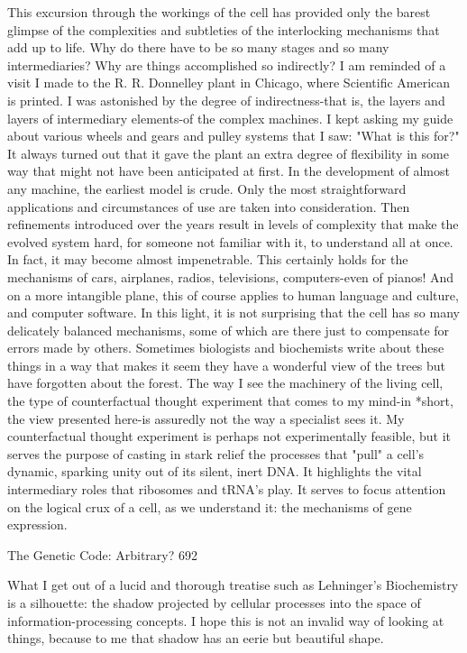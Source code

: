          This excursion through the workings of the cell has provided only the barest
glimpse of the complexities and subtleties of the interlocking mechanisms that add up
to life. Why do there have to be so many stages and so many intermediaries? Why are
things accomplished so indirectly?
         I am reminded of a visit I made to the R. R. Donnelley plant in Chicago, where
Scientific American is printed. I was astonished by the degree of indirectness-that is,
the layers and layers of intermediary elements-of the complex machines. I kept asking
my guide about various wheels and gears and pulley systems that I saw: "What is this
for?" It always turned out that it gave the plant an extra degree of flexibility in some
way that might not have been anticipated at first. In the development of almost any
machine, the earliest model is crude. Only the most straightforward applications and
circumstances of use are taken into consideration. Then refinements introduced over
the years result in levels of complexity that make the evolved system hard, for
someone not familiar with it, to understand all at once. In fact, it may become almost
impenetrable. This certainly holds for the mechanisms of cars, airplanes, radios,
televisions, computers-even of pianos! And on a more intangible plane, this of course
applies to human language and culture, and computer software.
         In this light, it is not surprising that the cell has so many delicately balanced
mechanisms, some of which are there just to compensate for errors made by others.
Sometimes biologists and biochemists write about these things in a way that makes it
seem they have a wonderful view of the trees but have forgotten about the forest. The
way I see the machinery of the living cell, the type of counterfactual thought
experiment that comes to my mind-in *short, the view presented here-is assuredly not
the way a specialist sees it. My counterfactual thought experiment is perhaps not
experimentally feasible, but it serves the purpose of casting in stark relief the
processes that "pull" a cell's dynamic, sparking unity out of its silent, inert DNA. It
highlights the vital intermediary roles that ribosomes and tRNA's play. It serves to
focus attention on the logical crux of a cell, as we understand it: the mechanisms of
gene expression.




The Genetic Code: Arbitrary?                                                          692

        What I get out of a lucid and thorough treatise such as Lehninger's
Biochemistry is a silhouette: the shadow projected by cellular processes into the space
of information-processing concepts. I hope this is not an invalid way of looking at
things, because to me that shadow has an eerie but beautiful shape.

